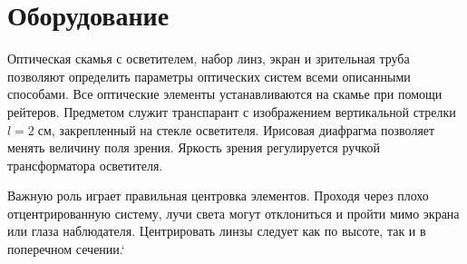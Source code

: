 \section{Оборудование}
Оптическая скамья с осветителем, набор линз, экран и зрительная труба позволяют определить параметры оптических систем всеми описанными способами. Все оптические элементы устанавливаются на скамье при помощи рейтеров. Предметом служит транспарант с изображением вертикальной стрелки $l = 2\;\text{см}$, закрепленный на стекле осветителя. Ирисовая диафрагма позволяет менять величину поля зрения. Яркость зрения регулируется ручкой трансформатора осветителя.

Важную роль играет правильная центровка элементов. Проходя через плохо отцентрированную систему, лучи света могут отклониться и пройти мимо экрана или глаза наблюдателя. Центрировать линзы следует как по высоте, так и в поперечном сечении.`
